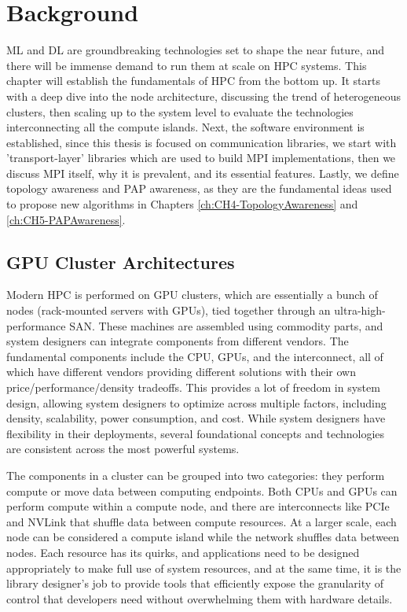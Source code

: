 
\chapter[Background]{Background}\label{ch:CH2-Background}

\gls{ML} and \gls{DL} are groundbreaking technologies set to shape the near future, and there will be immense demand to run them at scale on \gls{HPC} systems.
This chapter will establish the fundamentals of \gls{HPC} from the bottom up.
It starts with a deep dive into the node architecture, discussing the trend of heterogeneous clusters, then scaling up to the system level to evaluate the technologies interconnecting all the compute islands.
Next, the software environment is established, since this thesis is focused on communication libraries, we start with 'transport-layer' libraries which are used to build \gls{MPI} implementations, then we discuss \gls{MPI} itself, why it is prevalent, and its essential features. 
Lastly, we define topology awareness and \gls{PAP} awareness, as they are the fundamental ideas used to propose new algorithms in Chapters \ref{ch:CH4-TopologyAwareness} and \ref{ch:CH5-PAPAwareness}.

\section{GPU Cluster Architectures}
Modern \gls{HPC} is performed on \gls{GPU} clusters, which are essentially a bunch of nodes (rack-mounted servers with \gls{GPU}s), tied together through an ultra-high-performance \gls{SAN}.
These machines are assembled using commodity parts, and system designers can integrate components from different vendors.
The fundamental components include the \gls{CPU}, \gls{GPU}s, and the interconnect, all of which have different vendors providing different solutions with their own price/performance/density tradeoffs.
This provides a lot of freedom in system design, allowing system designers to optimize across multiple factors, including density, scalability, power consumption, and cost.
While system designers have flexibility in their deployments, several foundational concepts and technologies are consistent across the most powerful systems.

The components in a cluster can be grouped into two categories: they perform compute or move data between computing endpoints.
Both \gls{CPU}s and \gls{GPU}s can perform compute within a compute node, and there are interconnects like \gls{PCIe} and NVLink that shuffle data between compute resources.
At a larger scale, each node can be considered a compute island while the network shuffles data between nodes.
Each resource has its quirks, and applications need to be designed appropriately to make full use of system resources, and at the same time, it is the library designer's job to provide tools that efficiently expose the granularity of control that developers need without overwhelming them with hardware details.


